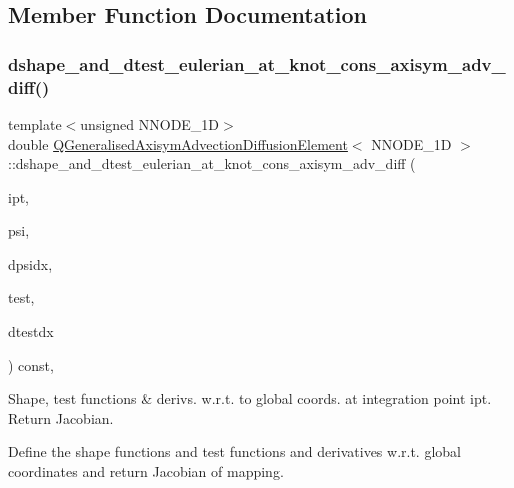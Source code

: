 \subsection{Member Function Documentation}
\mbox{\label{classQGeneralisedAxisymAdvectionDiffusionElement_a78eca532d205360e75d634283b53b1b5}} 
\subsubsection{\texorpdfstring{dshape\+\_\+and\+\_\+dtest\+\_\+eulerian\+\_\+at\+\_\+knot\+\_\+cons\+\_\+axisym\+\_\+adv\+\_\+diff()}{dshape\_and\_dtest\_eulerian\_at\_knot\_cons\_axisym\_adv\_diff()}}
{\footnotesize\ttfamily template$<$unsigned N\+N\+O\+D\+E\+\_\+1D$>$ \\
double \hyperlink{classQGeneralisedAxisymAdvectionDiffusionElement}{Q\+Generalised\+Axisym\+Advection\+Diffusion\+Element}$<$ N\+N\+O\+D\+E\+\_\+1D $>$\+::dshape\+\_\+and\+\_\+dtest\+\_\+eulerian\+\_\+at\+\_\+knot\+\_\+cons\+\_\+axisym\+\_\+adv\+\_\+diff (\begin{DoxyParamCaption}\item[{const unsigned \&}]{ipt,  }\item[{Shape \&}]{psi,  }\item[{D\+Shape \&}]{dpsidx,  }\item[{Shape \&}]{test,  }\item[{D\+Shape \&}]{dtestdx }\end{DoxyParamCaption}) const\hspace{0.3cm}{\ttfamily [inline]}, {\ttfamily [protected]}}



Shape, test functions \& derivs. w.\+r.\+t. to global coords. at integration point ipt. Return Jacobian. 

Define the shape functions and test functions and derivatives w.\+r.\+t. global coordinates and return Jacobian of mapping.

